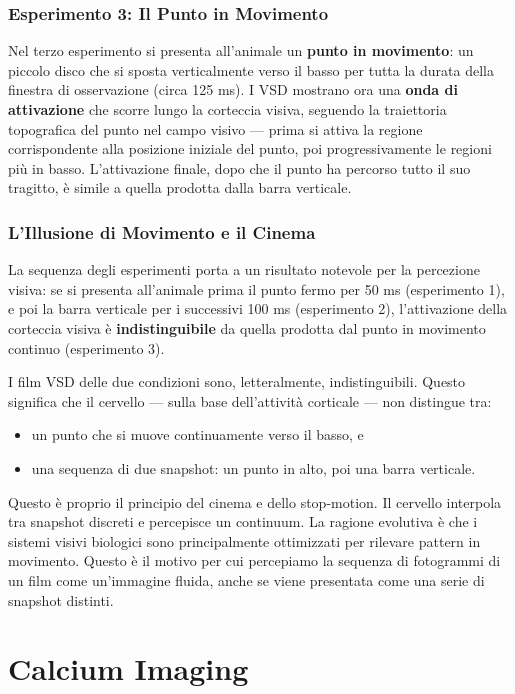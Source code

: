 \subsubsection{Esperimento 3: Il Punto in Movimento}

Nel terzo esperimento si presenta all'animale un \textbf{punto in movimento}: un piccolo disco che si sposta verticalmente verso il basso per tutta la durata della finestra di osservazione (circa 125 ms). I VSD mostrano ora una \textbf{onda di attivazione} che scorre lungo la corteccia visiva, seguendo la traiettoria topografica del punto nel campo visivo — prima si attiva la regione corrispondente alla posizione iniziale del punto, poi progressivamente le regioni più in basso.
L'attivazione finale, dopo che il punto ha percorso tutto il suo tragitto, è simile a quella prodotta dalla barra verticale.

\subsubsection{L'Illusione di Movimento e il Cinema}

La sequenza degli esperimenti porta a un risultato notevole per la percezione visiva: se si presenta all'animale prima il punto fermo per 50 ms (esperimento 1), e poi la barra verticale per i successivi 100 ms (esperimento 2), l'attivazione della corteccia visiva è \textbf{indistinguibile} da quella prodotta dal punto in movimento continuo (esperimento 3).

I film VSD delle due condizioni sono, letteralmente, indistinguibili. Questo significa che il cervello — sulla base dell'attività corticale — non distingue tra:
\begin{itemize}
    \item un punto che si muove continuamente verso il basso, e
    \item una sequenza di due snapshot: un punto in alto, poi una barra verticale.
\end{itemize}

Questo è proprio il principio del cinema e dello stop-motion. Il cervello interpola tra snapshot discreti e percepisce un continuum. La ragione evolutiva è che i sistemi visivi biologici sono principalmente ottimizzati per rilevare pattern in movimento. Questo è il motivo per cui percepiamo la sequenza di fotogrammi di un film come un'immagine fluida, anche se viene presentata come una serie di snapshot distinti.



\section{Calcium Imaging}

